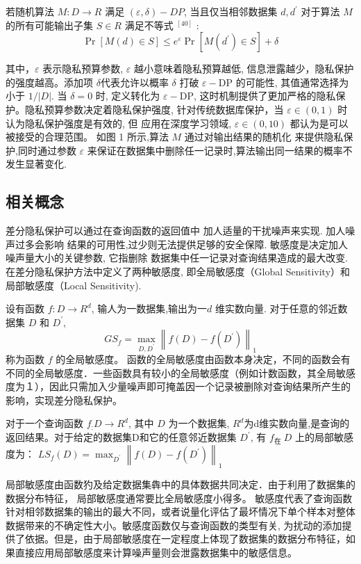 \begin{define}[成立条件]\label{成立条件}

若随机算法 $M: D \rightarrow R$ 满足 $(\varepsilon, \delta)-D P$, 当且仅当相邻数据集 $d, d^{\prime}$ 对于算法 $M$ 的所有可能输出子集 $S \in R$ 满足不等式 $^{[40]}$ :
$$
\operatorname{Pr}[M(d) \in S] \leq e^{\varepsilon} \operatorname{Pr}\left[M\left(d^{\prime}\right) \in S\right]+\delta
$$

其中，$\varepsilon$ 表示隐私预算参数, $\varepsilon$ 越小意味着隐私预算越低, 信息泄露越少，隐私保护的强度越高。添加项 $\delta$代表允许以概率 $\delta$ 打破 $\varepsilon-\mathrm{DP}$ 的可能性, 其值通常选择为小于 $1 /|D|$. 当 $\delta=0$ 时, 定义转化为 $\varepsilon-\mathrm{DP}$, 这时机制提供了更加严格的隐私保护。隐私预算参数决定着隐私保护强度, 针对传统数据库保护，当 $\varepsilon \in(0,1)$ 时认为隐私保护强度是有效的, 但 应用在深度学习领域, $\varepsilon \in(0,10)$ 都认为是可以被接受的合理范围。
如图 1 所示,算法 $M$ 通过对输出结果的随机化 来提供隐私保护,同时通过参数 $\varepsilon$ 来保证在数据集中删除任一记录时,算法输出同一结果的概率不发生显著变化.
\end{define}

\subsection{相关概念}
差分隐私保护可以通过在查询函数的返回值中 加人适量的干扰噪声来实现. 加人噪声过多会影响 结果的可用性,过少则无法提供足够的安全保障. 敏感度是决定加人噪声量大小的关键参数, 它指删除 数据集中任一记录对查询结果造成的最大改变. 在差分隐私保护方法中定义了两种敏感度, 即全局敏感度（Global Sensitivity）和局部敏感度（Local Sensitivity).

\begin{define}[全局敏感度]\label{全局敏感度}
设有函数 $f: D \rightarrow R^{d}$, 输人为一数据集,输出为一$d$ 维实数向量. 对于任意的邻近数据集 $D$ 和 $D^{\prime}$,
$$
G S_{f}=\max _{D, D^{\prime}}\left\|f(D)-f\left(D^{\prime}\right)\right\|_{1}
$$
称为函数 $f$ 的全局敏感度。
函数的全局敏感度由函数本身决定，不同的函数会有不同的全局敏感度．一些函数具有较小的全局敏感度（例如计数函数，其全局敏感度为１），因此只需加入少量噪声即可掩盖因一个记录被删除对查询结果所产生的影响，实现差分隐私保护。
\end{define}

\begin{define}[局部敏感度]\label{局部敏感度}
对于一个查询函数 $f_{:} D \rightarrow R^{d}$, 其中 $D$ 为一个数据集, $R^{d}$为d维实数向量,是查询的返回结果。对于给定的数据集D和它的任意邻近数据集 $D^{\prime}$, 有 $f_{\text {在 }} D$ 上的局部敏感度为：
$L S_{f}(D)=\max _{D^{\prime}}\left\|f(D)-f\left(D^{\prime}\right)\right\|_{1}$

局部敏感度由函数犳及给定数据集犇中的具体数据共同决定．由于利用了数据集的数据分布特征， 局部敏感度通常要比全局敏感度小得多。
敏感度代表了查询函数针对相邻数据集的输出的最大不同，或者说量化评估了最坏情况下单个样本对整体数据带来的不确定性大小。敏感度函数仅与查询函数的类型有关, 为扰动的添加提供了依据。但是，由于局部敏感度在一定程度上体现了数据集的数据分布特征，如果直接应用局部敏感度来计算噪声量则会泄露数据集中的敏感信息。
\end{define}

